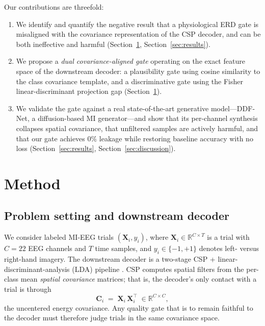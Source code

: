 \documentclass[conference]{IEEEtran}
\newcommand{\R}{\mathbb{R}}
\begin{document}
Our contributions are threefold:
\begin{enumerate}
  \item We identify and quantify the negative result that a physiological ERD
        gate is misaligned with the covariance representation of the CSP
        decoder, and can be both ineffective and harmful (Section~\ref{sec:method},
        Section~\ref{sec:results}).
  \item We propose a \emph{dual covariance-aligned gate} operating on the exact
        feature space of the downstream decoder: a plausibility gate using
        cosine similarity to the class covariance template, and a discriminative
        gate using the Fisher linear-discriminant projection gap
        (Section~\ref{sec:method}).
  \item We validate the gate against a real state-of-the-art generative
        model---DDF-Net, a diffusion-based MI generator---and show that its
        per-channel synthesis collapses spatial covariance, that unfiltered
        samples are actively harmful, and that our gate achieves $0\%$ leakage
        while restoring baseline accuracy with no loss (Section~\ref{sec:results},
        Section~\ref{sec:discussion}).
\end{enumerate}

\section{Method}
\label{sec:method}

\subsection{Problem setting and downstream decoder}
\label{sec:setting}

We consider labeled MI-EEG trials $(\mathbf{X}_i, y_i)$, where
$\mathbf{X}_i\in\R^{C\times T}$ is a trial with $C=22$ EEG channels and $T$ time
samples, and $y_i\in\{-1,+1\}$ denotes left- versus right-hand imagery. The
downstream decoder is a two-stage CSP + linear-discriminant-analysis (LDA)
pipeline \cite{ramoser2000optimal,blankertz2008optimizing}. CSP computes spatial
filters from the per-class mean \emph{spatial covariance} matrices; that is, the
decoder's only contact with a trial is through
\begin{equation}
  \mathbf{C}_i \;=\; \mathbf{X}_i\,\mathbf{X}_i^{\top}\;\in\R^{C\times C},
  \label{eq:cov}
\end{equation}
the uncentered energy covariance. Any quality gate that is to remain faithful to
the decoder must therefore judge trials in the same covariance space.
\end{document}
